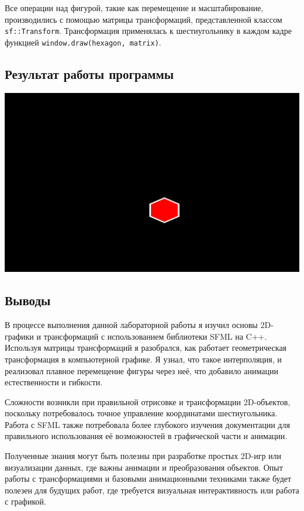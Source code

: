 \documentclass[12pt]{article}
\begin{document}
Все операции над фигурой, такие как перемещение и масштабирование, производились
с помощью матрицы трансформаций, представленной классом \texttt{sf::Transform}.
Трансформация применялась к шестиугольнику в каждом кадре функцией \texttt{window.draw(hexagon, matrix)}.

\subsection*{Результат работы программы}

\includegraphics[width=15cm]{demo.png}

\subsection*{Выводы}

В процессе выполнения данной лабораторной работы я изучил основы 2D-графики
и трансформаций с использованием библиотеки SFML на C++.
Используя матрицы трансформаций я разобрался,
как работает геометрическая трансформация в компьютерной графике.
Я узнал, что такое интерполяция, и реализовал плавное перемещение фигуры
через неё, что добавило анимации естественности и гибкости.

Сложности возникли при правильной отрисовке
и трансформации 2D-объектов, поскольку потребовалось
точное управление координатами шестиугольника.
Работа с SFML также потребовала более глубокого изучения документации
для правильного использования её возможностей в графической части и анимации.

Полученные знания могут быть полезны при разработке простых 2D-игр
или визуализации данных, где важны анимации и преобразования объектов.
Опыт работы с трансформациями и базовыми анимационными техниками также будет
полезен для будущих работ, где требуется визуальная интерактивность или работа с графикой.
\end{document}
